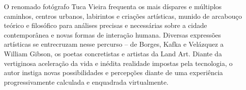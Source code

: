 O renomado fotógrafo Tuca Vieira frequenta os mais díspares e múltiplos caminhos, centros urbanos, labirintos e criações artísticas, munido de arcabouço teórico e filosófico para análises precisas e necessárias sobre a cidade contemporânea e novas formas de interação humana. Diversas expressões artísticas se entrecruzam nesse percurso – de Borges, Kafka e Velázquez a William Gibson, os poetas concretistas e artistas da Land Art. Diante da vertiginosa aceleração da vida e inédita realidade impostas pela tecnologia, o autor instiga novas possibilidades e percepções diante de uma experiência progressivamente calculada e enquadrada virtualmente. 

\vfill

\hspace*{-.4cm}\begin{minipage}[c]{.5\linewidth}
\small{
{}}
\end{minipage}

\pagebreak

\vspace*{1.5cm}


\bigskip

\hfill{}

\bigskip
\bigskip
\bigskip

